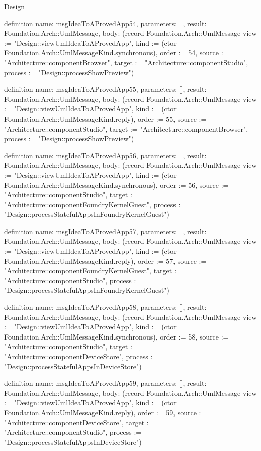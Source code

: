 \begin{lexlean}{Design}
\begin{semanticmodule}
definition{
  name: msgIdeaToAProvedApp54,
  parameters: [],
  result: Foundation.Arch::UmlMessage,
  body: (record Foundation.Arch::UmlMessage {view := "Design::viewUmlIdeaToAProvedApp", kind := (ctor Foundation.Arch::UmlMessageKind.synchronous), order := 54, source := "Architecture::componentBrowser", target := "Architecture::componentStudio", process := "Design::processShowPreview"})
}

definition{
  name: msgIdeaToAProvedApp55,
  parameters: [],
  result: Foundation.Arch::UmlMessage,
  body: (record Foundation.Arch::UmlMessage {view := "Design::viewUmlIdeaToAProvedApp", kind := (ctor Foundation.Arch::UmlMessageKind.reply), order := 55, source := "Architecture::componentStudio", target := "Architecture::componentBrowser", process := "Design::processShowPreview"})
}

definition{
  name: msgIdeaToAProvedApp56,
  parameters: [],
  result: Foundation.Arch::UmlMessage,
  body: (record Foundation.Arch::UmlMessage {view := "Design::viewUmlIdeaToAProvedApp", kind := (ctor Foundation.Arch::UmlMessageKind.synchronous), order := 56, source := "Architecture::componentStudio", target := "Architecture::componentFoundryKernelGuest", process := "Design::processStatefulAppsInFoundryKernelGuest"})
}

definition{
  name: msgIdeaToAProvedApp57,
  parameters: [],
  result: Foundation.Arch::UmlMessage,
  body: (record Foundation.Arch::UmlMessage {view := "Design::viewUmlIdeaToAProvedApp", kind := (ctor Foundation.Arch::UmlMessageKind.reply), order := 57, source := "Architecture::componentFoundryKernelGuest", target := "Architecture::componentStudio", process := "Design::processStatefulAppsInFoundryKernelGuest"})
}

definition{
  name: msgIdeaToAProvedApp58,
  parameters: [],
  result: Foundation.Arch::UmlMessage,
  body: (record Foundation.Arch::UmlMessage {view := "Design::viewUmlIdeaToAProvedApp", kind := (ctor Foundation.Arch::UmlMessageKind.synchronous), order := 58, source := "Architecture::componentStudio", target := "Architecture::componentDeviceStore", process := "Design::processStatefulAppsInDeviceStore"})
}

definition{
  name: msgIdeaToAProvedApp59,
  parameters: [],
  result: Foundation.Arch::UmlMessage,
  body: (record Foundation.Arch::UmlMessage {view := "Design::viewUmlIdeaToAProvedApp", kind := (ctor Foundation.Arch::UmlMessageKind.reply), order := 59, source := "Architecture::componentDeviceStore", target := "Architecture::componentStudio", process := "Design::processStatefulAppsInDeviceStore"})
}


\end{semanticmodule}
\end{lexlean}
